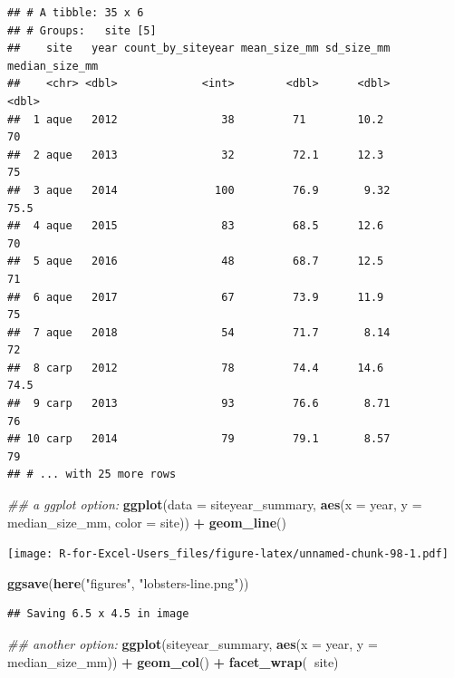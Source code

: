 \documentclass[]{book}
\newenvironment{Shaded}{\begin{snugshade}}{\end{snugshade}}
\newcommand{\CommentTok}[1]{\textcolor[rgb]{0.56,0.35,0.01}{\textit{#1}}}
\newcommand{\DataTypeTok}[1]{\textcolor[rgb]{0.13,0.29,0.53}{#1}}
\newcommand{\KeywordTok}[1]{\textcolor[rgb]{0.13,0.29,0.53}{\textbf{#1}}}
\newcommand{\NormalTok}[1]{#1}
\newcommand{\OperatorTok}[1]{\textcolor[rgb]{0.81,0.36,0.00}{\textbf{#1}}}
\newcommand{\StringTok}[1]{\textcolor[rgb]{0.31,0.60,0.02}{#1}}
\begin{document}
\begin{verbatim}
## # A tibble: 35 x 6
## # Groups:   site [5]
##    site   year count_by_siteyear mean_size_mm sd_size_mm median_size_mm
##    <chr> <dbl>             <int>        <dbl>      <dbl>          <dbl>
##  1 aque   2012                38         71        10.2            70  
##  2 aque   2013                32         72.1      12.3            75  
##  3 aque   2014               100         76.9       9.32           75.5
##  4 aque   2015                83         68.5      12.6            70  
##  5 aque   2016                48         68.7      12.5            71  
##  6 aque   2017                67         73.9      11.9            75  
##  7 aque   2018                54         71.7       8.14           72  
##  8 carp   2012                78         74.4      14.6            74.5
##  9 carp   2013                93         76.6       8.71           76  
## 10 carp   2014                79         79.1       8.57           79  
## # ... with 25 more rows
\end{verbatim}

\begin{Shaded}
\begin{Highlighting}[]
\CommentTok{## a ggplot option:}
\KeywordTok{ggplot}\NormalTok{(}\DataTypeTok{data =}\NormalTok{ siteyear_summary, }\KeywordTok{aes}\NormalTok{(}\DataTypeTok{x =}\NormalTok{ year, }\DataTypeTok{y =}\NormalTok{ median_size_mm, }\DataTypeTok{color =}\NormalTok{ site)) }\OperatorTok{+}
\StringTok{  }\KeywordTok{geom_line}\NormalTok{() }
\end{Highlighting}
\end{Shaded}

\texttt{[image: R-for-Excel-Users\_files/figure-latex/unnamed-chunk-98-1.pdf]}

\begin{Shaded}
\begin{Highlighting}[]
\KeywordTok{ggsave}\NormalTok{(}\KeywordTok{here}\NormalTok{(}\StringTok{"figures"}\NormalTok{, }\StringTok{"lobsters-line.png"}\NormalTok{))}
\end{Highlighting}
\end{Shaded}

\begin{verbatim}
## Saving 6.5 x 4.5 in image
\end{verbatim}

\begin{Shaded}
\begin{Highlighting}[]
\CommentTok{## another option:}
\KeywordTok{ggplot}\NormalTok{(siteyear_summary, }\KeywordTok{aes}\NormalTok{(}\DataTypeTok{x =}\NormalTok{ year, }\DataTypeTok{y =}\NormalTok{ median_size_mm)) }\OperatorTok{+}
\StringTok{  }\KeywordTok{geom_col}\NormalTok{() }\OperatorTok{+}
\StringTok{  }\KeywordTok{facet_wrap}\NormalTok{(}\OperatorTok{~}\NormalTok{site)}
\end{Highlighting}
\end{Shaded}
\end{document}
